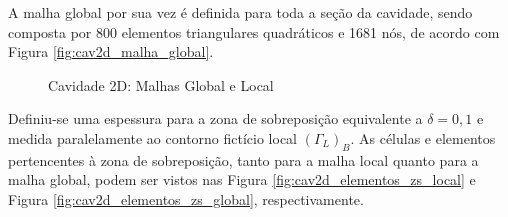 A malha global por sua vez é definida para toda a seção da cavidade, sendo composta por 800 elementos triangulares quadráticos e 1681 nós, de acordo com Figura \ref{fig:cav2d_malha_global}.

\begin{figure}[!htbp]
	\caption{Cavidade 2D: Malhas Global e Local}
	\centering
	\label{fig:cav2d_discretização}
\end{figure}

Definiu-se uma espessura para a zona de sobreposição equivalente a $\delta = 0,1$ e medida paralelamente ao contorno fictício local $(\Gamma_{L})_{B}$. As células e elementos pertencentes à zona de sobreposição, tanto para a malha local quanto para a malha global, podem ser vistos nas Figura \ref{fig:cav2d_elementos_zs_local} e Figura \ref{fig:cav2d_elementos_zs_global}, respectivamente.

